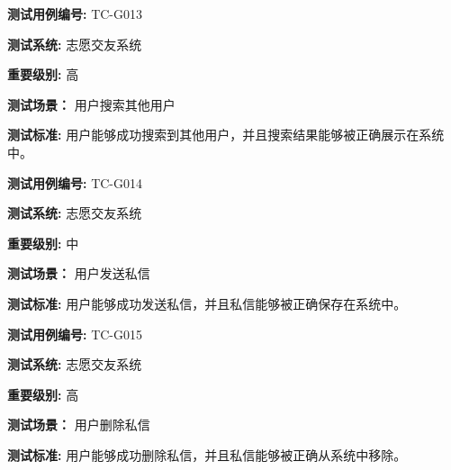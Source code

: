 \begin{framed} \textbf{测试用例编号:} TC-G013

\textbf{测试系统:} 志愿交友系统

\textbf{重要级别:} 高

\textbf{测试场景：} 用户搜索其他用户

\textbf{测试标准:} 用户能够成功搜索到其他用户，并且搜索结果能够被正确展示在系统中。

\begin{center}  \end{center} \end{framed}

\begin{framed} \textbf{测试用例编号:} TC-G014

\textbf{测试系统:} 志愿交友系统

\textbf{重要级别:} 中

\textbf{测试场景：} 用户发送私信

\textbf{测试标准:} 用户能够成功发送私信，并且私信能够被正确保存在系统中。

\begin{center}  \end{center} \end{framed}

\begin{framed} \textbf{测试用例编号:} TC-G015

\textbf{测试系统:} 志愿交友系统

\textbf{重要级别:} 高

\textbf{测试场景：} 用户删除私信

\textbf{测试标准:} 用户能够成功删除私信，并且私信能够被正确从系统中移除。

\begin{center}  \end{center} \end{framed}